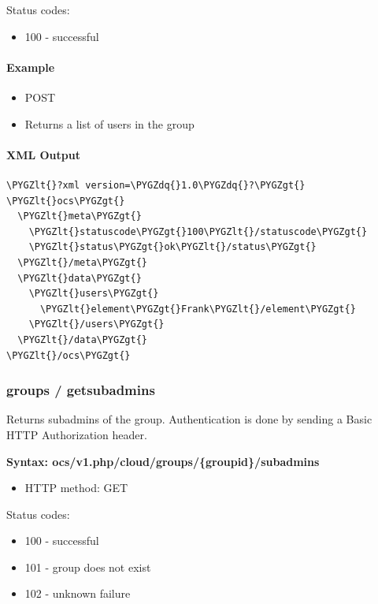 \documentclass[letterpaper,10pt,english]{sphinxmanual}
\def\PYGZlt{\char`\<}
\def\PYGZgt{\char`\>}
\def\PYGZdq{\char`\"}
\begin{document}
Status codes:
\begin{itemize}
\item {} 
100 - successful

\end{itemize}


\paragraph{Example}
\label{configuration_user/user_provisioning_api:id24}\begin{itemize}
\item {} 
POST 

\item {} 
Returns a list of users in the  group

\end{itemize}


\paragraph{XML Output}
\label{configuration_user/user_provisioning_api:id25}
\begin{Verbatim}[commandchars=\\\{\}]
\PYGZlt{}?xml version=\PYGZdq{}1.0\PYGZdq{}?\PYGZgt{}
\PYGZlt{}ocs\PYGZgt{}
  \PYGZlt{}meta\PYGZgt{}
    \PYGZlt{}statuscode\PYGZgt{}100\PYGZlt{}/statuscode\PYGZgt{}
    \PYGZlt{}status\PYGZgt{}ok\PYGZlt{}/status\PYGZgt{}
  \PYGZlt{}/meta\PYGZgt{}
  \PYGZlt{}data\PYGZgt{}
    \PYGZlt{}users\PYGZgt{}
      \PYGZlt{}element\PYGZgt{}Frank\PYGZlt{}/element\PYGZgt{}
    \PYGZlt{}/users\PYGZgt{}
  \PYGZlt{}/data\PYGZgt{}
\PYGZlt{}/ocs\PYGZgt{}
\end{Verbatim}


\subsubsection{\textbf{groups / getsubadmins}}
\label{configuration_user/user_provisioning_api:groups-getsubadmins}
Returns subadmins of the group. Authentication is done by
sending a Basic HTTP Authorization header.

\textbf{Syntax: ocs/v1.php/cloud/groups/\{groupid\}/subadmins}
\begin{itemize}
\item {} 
HTTP method: GET

\end{itemize}

Status codes:
\begin{itemize}
\item {} 
100 - successful

\item {} 
101 - group does not exist

\item {} 
102 - unknown failure

\end{itemize}
\end{document}
